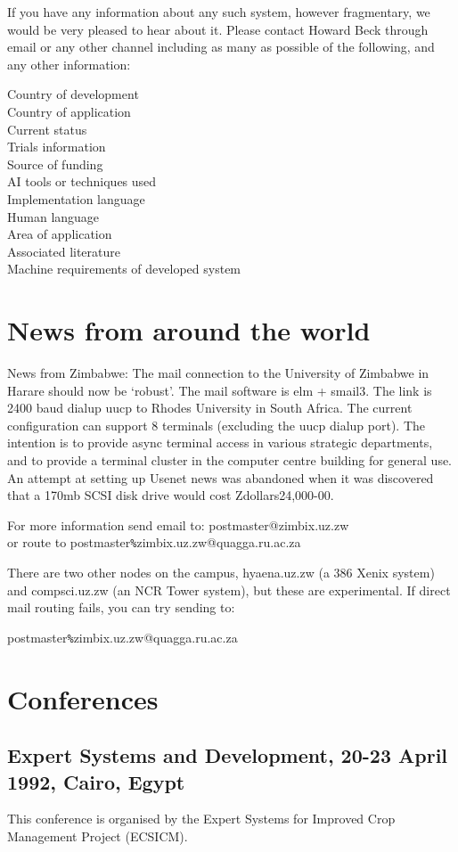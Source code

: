 If you have any information about any such system, however
fragmentary, we would be very pleased to hear about it. Please contact
Howard Beck through email or any other channel including as many as possible of
the following, and any other information:

Country of development\\
Country of application\\
Current status\\
Trials information\\
Source of funding\\
AI tools or techniques used \\
Implementation language\\
Human language\\
Area of application\\
Associated literature\\
Machine requirements of developed system

\section{News from around the world}
News from Zimbabwe:
The mail connection to the University of Zimbabwe in Harare should now
be `robust'. The mail software is elm + smail3.  The link is 2400 baud
dialup uucp to Rhodes University in South Africa.
The current configuration can support 8 terminals (excluding
the uucp dialup port).  The intention is to provide async terminal
access in various strategic departments, and to provide a terminal
cluster in the computer centre building for general use.
An attempt at setting up Usenet news was abandoned when it was
discovered that a 170mb SCSI disk drive would cost Zdollars24,000-00.

For more information send email to:  postmaster@zimbix.uz.zw \\
or route to postmaster\verb+%+zimbix.uz.zw@quagga.ru.ac.za

There are two other nodes on the campus, hyaena.uz.zw (a 386 Xenix
system) and compsci.uz.zw (an NCR Tower system), but these are
experimental. If direct mail routing fails, you can try sending to:

     postmaster\verb+%+zimbix.uz.zw@quagga.ru.ac.za

\section{Conferences}
\subsection{Expert Systems and Development, 20-23 April 1992, Cairo,
Egypt}
This conference is organised by the Expert Systems for Improved Crop
Management Project (ECSICM).

